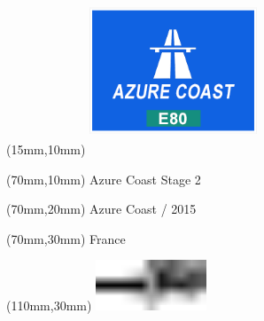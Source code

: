 \null\newpage
\begin{textblock*}{50mm}(15mm,10mm)%
\includegraphics[width=50mm]{LG/AZO.png}
\end{textblock*}
\begin{textblock*}{130mm}(70mm,10mm)%
{\fontsize{20}{20}\selectfont Azure Coast Stage 2}\\
\end{textblock*}
\begin{textblock*}{120mm}(70mm,20mm)%
{\fontsize{16}{16}\selectfont Azure Coast / 2015}\\
\end{textblock*}
\begin{textblock*}{120mm}(70mm,30mm)%
{\fontsize{12}{12}\selectfont France}
\end{textblock*}
\begin{textblock*}{30mm}(110mm,30mm)%
\centering
\includegraphics[height=15mm]{icons/tofinish.pdf}
\end{textblock*}
